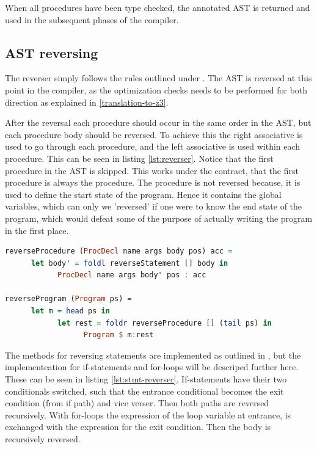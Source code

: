 When all procedures have been type checked, the annotated AST is returned and used in the
subsequent phases of the compiler.

\subsection{AST reversing }
The reverser simply follows the rules outlined under . The AST is
reversed at this point in the compiler, as the optimization checks needs to be performed for both
direction as explained in \ref{translation-to-z3}.

After the reversal each procedure should occur in the same order in the AST, but each
procedure body should be reversed. To achieve this the right associative  is used to
go through each procedure, and the left associative  is used within each procedure.
This can be seen in listing \ref{lst:reverser}. Notice that the first procedure in the AST is
skipped. This works under the contract, that the first procedure is always the 
procedure. The  procedure is not reversed because, it is used to define the start state
of the program. Hence it contains the global variables, which can only we 'reversed' if one were
to know the end state of the program, which would defeat some of the purpose of actually writing
the program in the first place.

\begin{lstlisting}[language=Haskell, label={lst:reverser}, caption={Reversing AST.}]
reverseProcedure (ProcDecl name args body pos) acc =
      let body' = foldl reverseStatement [] body in
            ProcDecl name args body' pos : acc

reverseProgram (Program ps) =
      let m = head ps in
            let rest = foldr reverseProcedure [] (tail ps) in
                  Program $ m:rest
\end{lstlisting}
\noindent
The methods for reversing statements are implemented as outlined in ,
but the implementeation for if-statements and for-loops will be descriped further here. These
can be seen in listing \ref{lst:stmt-reverser}. If-statements have their two conditionals switched,
such that the entrance conditional becomes the exit condition (from if path) and vice verser.
Then both paths are reversed recursively. With for-loops the expression of the loop variable at
entrance, is exchanged with the expression for the exit condition. Then the body is recursively
reversed.

